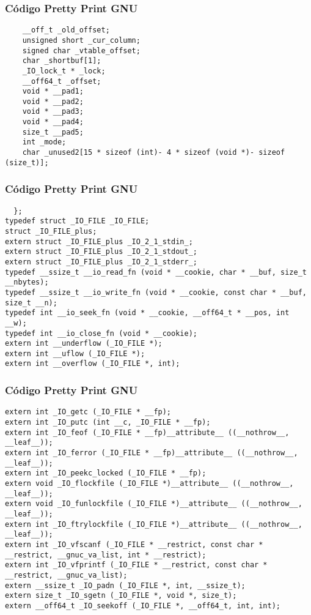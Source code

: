 \documentclass{beamer}
\begin{document}
\begin{frame}[fragile]
\frametitle{C\'odigo Pretty Print GNU}
\begin{verbatim}
    __off_t _old_offset;
    unsigned short _cur_column;
    signed char _vtable_offset;
    char _shortbuf[1];
    _IO_lock_t * _lock;
    __off64_t _offset;
    void * __pad1;
    void * __pad2;
    void * __pad3;
    void * __pad4;
    size_t __pad5;
    int _mode;
    char _unused2[15 * sizeof (int)- 4 * sizeof (void *)- sizeof (size_t)];
\end{verbatim}
\end{frame}
\begin{frame}[fragile]
\frametitle{C\'odigo Pretty Print GNU}
\begin{verbatim}
  };
typedef struct _IO_FILE _IO_FILE;
struct _IO_FILE_plus;
extern struct _IO_FILE_plus _IO_2_1_stdin_;
extern struct _IO_FILE_plus _IO_2_1_stdout_;
extern struct _IO_FILE_plus _IO_2_1_stderr_;
typedef __ssize_t __io_read_fn (void * __cookie, char * __buf, size_t __nbytes);
typedef __ssize_t __io_write_fn (void * __cookie, const char * __buf, size_t __n);
typedef int __io_seek_fn (void * __cookie, __off64_t * __pos, int __w);
typedef int __io_close_fn (void * __cookie);
extern int __underflow (_IO_FILE *);
extern int __uflow (_IO_FILE *);
extern int __overflow (_IO_FILE *, int);
\end{verbatim}
\end{frame}
\begin{frame}[fragile]
\frametitle{C\'odigo Pretty Print GNU}
\begin{verbatim}
extern int _IO_getc (_IO_FILE * __fp);
extern int _IO_putc (int __c, _IO_FILE * __fp);
extern int _IO_feof (_IO_FILE * __fp)__attribute__ ((__nothrow__, __leaf__));
extern int _IO_ferror (_IO_FILE * __fp)__attribute__ ((__nothrow__, __leaf__));
extern int _IO_peekc_locked (_IO_FILE * __fp);
extern void _IO_flockfile (_IO_FILE *)__attribute__ ((__nothrow__, __leaf__));
extern void _IO_funlockfile (_IO_FILE *)__attribute__ ((__nothrow__, __leaf__));
extern int _IO_ftrylockfile (_IO_FILE *)__attribute__ ((__nothrow__, __leaf__));
extern int _IO_vfscanf (_IO_FILE * __restrict, const char * __restrict, __gnuc_va_list, int * __restrict);
extern int _IO_vfprintf (_IO_FILE * __restrict, const char * __restrict, __gnuc_va_list);
extern __ssize_t _IO_padn (_IO_FILE *, int, __ssize_t);
extern size_t _IO_sgetn (_IO_FILE *, void *, size_t);
extern __off64_t _IO_seekoff (_IO_FILE *, __off64_t, int, int);
\end{verbatim}
\end{frame}
\end{document}
